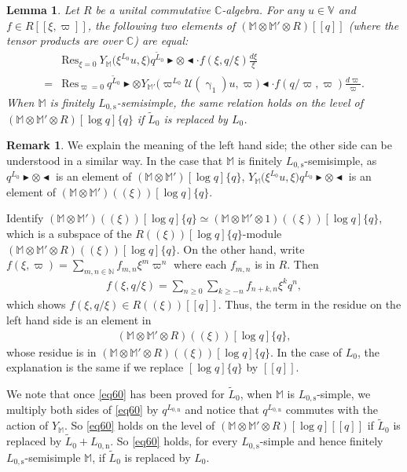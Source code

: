 \documentclass[12pt,a4paper,notitlepage]{article}
\theoremstyle{definition}
\newtheorem{rem}[df]{Remark}
\theoremstyle{plain}
\newtheorem{lm}[df]{Lemma}
\newcommand{\mc}{\mathcal}
\newcommand{\wtd}{\widetilde}
\newcommand{\Res}{\mathrm{Res}}
\newcommand{\Vbb}{\mathbb V}
\newcommand{\Mbb}{\mathbb M}
\newcommand{\Cbb}{\mathbb C}
\newcommand{\Nbb}{\mathbb N}
\newcommand{\btl}{\blacktriangleleft}
\newcommand{\btr}{\blacktriangleright}
\newcommand{\Lss}{{L_{0,\mathrm{s}}}}
\newcommand{\Lni}{{L_{0,\mathrm{n}}}}
\numberwithin{equation}{section}
\begin{document}
\begin{lm}\label{lb32}
	Let $R$ be a unital commutative $\Cbb$-algebra.  For any $u\in\Vbb$ and $f\in R[[\xi,\varpi]]$, the following two elements of $(\Mbb\otimes\Mbb'\otimes R)[[q]]$ (where the tensor products are over $\Cbb$) are equal:
	\begin{align}
	&\Res_{\xi=0}~Y_{\Mbb}\big(\xi^{L_0}u,\xi\big)q^{\wtd L_0}\btr\otimes\btl\cdot f(\xi,q/\xi)\frac{d\xi}{\xi}\nonumber\\
	=&\Res_{\varpi=0}~q^{\wtd L_0}\btr\otimes Y_{\Mbb'}\big(\varpi^{L_0}\mc U(\upgamma_1)u,\varpi\big)\btl\cdot f(q/\varpi,\varpi)\frac{d\varpi}{\varpi}.\label{eq60}
	\end{align}
When $\Mbb$ is finitely $\Lss$-semisimple, the same relation holds on the level of $(\Mbb\otimes\Mbb'\otimes R)[\log q]\{q\}$ if $\wtd L_0$ is replaced by $L_0$.
\end{lm}


\begin{rem}\label{lb33}
We  explain the meaning of the left hand side; the other side can be understood in a similar way. In the case that $\Mbb$ is finitely $\Lss$-semisimple, as   $q^{L_0}\btr\otimes\btl$  is an element of $(\Mbb\otimes\Mbb')[\log q]\{q\}$, $Y_{\Mbb}\big(\xi^{L_0}u,\xi\big)q^{L_0}\btr\otimes\btl$ is an element of $(\Mbb\otimes\Mbb')((\xi))[\log q]\{q\}$. 

Identify $(\Mbb\otimes\Mbb')((\xi))[\log q]\{q\}\simeq (\Mbb\otimes\Mbb'\otimes 1)((\xi))[\log q]\{q\}$, which is a subspace of the $R((\xi))[\log q]\{q\}$-module $(\Mbb\otimes\Mbb'\otimes R)((\xi))[\log q]\{q\}$.  On the other hand,  write $f(\xi,\varpi)=\sum_{m,n\in\Nbb}f_{m,n}\xi^m\varpi^n$ where each $f_{m,n}$ is in $R$. Then
	\begin{align*}
	f(\xi,q/\xi)=\sum_{n\geq 0}\sum_{k\geq -n}f_{n+k,n}\xi^k q^n,
	\end{align*}
	which shows $f(\xi,q/\xi)\in R((\xi))[[q]]$. Thus, the term in the residue on the left hand side is an element in
	\begin{align*}
	(\Mbb\otimes\Mbb'\otimes R)((\xi))[\log q]\{q\},
	\end{align*}
	whose residue is in $(\Mbb\otimes\Mbb'\otimes R)((\xi))[\log q]\{q\}$. In the case of $L_0$, the explanation is the same if we replace $[\log q]\{q\}$ by $[[q]]$.
	
We note that once \eqref{eq60} has been proved for $\wtd L_0$, when $\Mbb$ is $\Lss$-simple, we multiply both sides of \eqref{eq60} by $q^\Lni$ and notice that $q^\Lni$ commutes with the action of $Y_\Mbb$. So \eqref{eq60} holds on the level of $(\Mbb\otimes\Mbb'\otimes R)[\log q][[q]]$ if $\wtd L_0$ is replaced by $\wtd L_0+\Lni$. So \eqref{eq60} holds, for every $\Lss$-simple and hence finitely $\Lss$-semisimple $\Mbb$, if $\wtd L_0$ is replaced	by $L_0$.
\end{rem}
\end{document}
